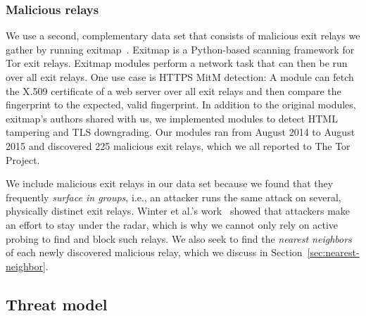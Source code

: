 \subsubsection{Malicious relays}
We use a second, complementary data set that consists of malicious exit relays
we gather by running exitmap~\cite[\S 3.1]{Winter2014a}.  Exitmap is a
Python-based scanning framework for Tor exit relays.  Exitmap modules perform a
network task that can then be run over all exit relays.  One use case is HTTPS
MitM detection: A module can fetch the X.509 certificate of a web server over
all exit relays and then compare the fingerprint to the expected, valid
fingerprint.  In addition to the original modules, exitmap's authors shared
with us, we implemented modules to detect HTML tampering and TLS downgrading.
Our modules ran from August 2014 to August 2015 and discovered 225 malicious
exit relays, which we all reported to The Tor Project.

We include malicious exit relays in our data set because we found that they
frequently \emph{surface in groups}, i.e., an attacker runs the same attack on
several, physically distinct exit relays.  Winter et al.'s work~\cite[\S
5.2]{Winter2014a} showed that attackers make an effort to stay under the radar,
which is why we cannot only rely on active probing to find and block such
relays.  We also seek to find the \emph{nearest neighbors} of each newly
discovered malicious relay, which we discuss in
Section~\ref{sec:nearest-neighbor}.

\subsection{Threat model}
\label{sec:threat_model}

